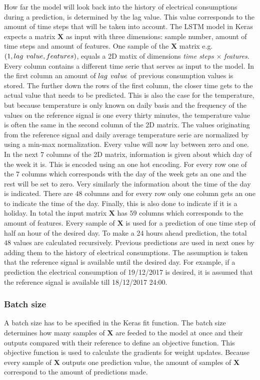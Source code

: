 How far the model will look back into the history of electrical consumptions during a prediction, is determined by the lag value. This value corresponds to the amount of time steps that will be taken into account. The LSTM model in Keras expects a matrix $ \bm{X} $ as input with three dimensions: sample number, amount of time steps and amount of features. 
One sample of the $ \bm{X} $ matrix e.g. $ (1,lag\hspace{1.5mm}value, features) $, equals a 2D matix of dimensions  \textit{time steps} $ \times $ \textit{features}. Every column contains a different time serie that serves as input to the model. In the first column an amount of $ lag\hspace{1.5mm}value $ of previous consumption values is stored. The further down the rows of the first column, the closer time gets to the actual value that needs to be predicted. This is also the case for the temperature, but because temperature is only known on daily basis and the frequency of the values on the reference signal is one every thirty minutes, the temperature value is often the same in the second column of the 2D matrix. The values originating from the reference signal and daily average temperature serie are normalized by using a min-max normalization. Every value will now lay between zero and one.\\
In the next $ 7 $ columns of the 2D matrix, information is given about which day of the week it is. This is encoded using an one hot encoding. For every row one of the $ 7 $ columns which corresponds with the day of the week gets an one and the rest will be set to zero. Very similarly the information about the time of the day is indicated. There are $ 48 $ columns and for every row only one column gets an one to indicate the time of the day. Finally, this is also done to indicate if it is a holiday. In total the input matrix $ \bm{X} $ has $ 59  $ columns which corresponds to the amount of features. Every sample of $ \bm{X} $ is used for a prediction of one time step of half an hour of the desired day. To make a 24 hours ahead prediction, the total $ 48 $ values are calculated recursively. Previous predictions are used in next ones by adding them to the history of electrical consumptions. The assumption is taken that the reference signal is available until the desired day. For example, if a prediction the electrical consumption of 19/12/2017 is desired, it is assumed that the reference signal is available till 18/12/2017 24:00.

\subsubsection{Batch size}
A batch size has to be specified in the Keras fit function. The batch size determines how many samples of $ \bm{X} $ are feeded to the model at once and their outputs compared with their reference to define an objective function. This objective function is used to calculate the gradients for weight updates. Because every sample of $ \bm{X} $ outputs one prediction value, the amount of samples of $ \bm{X} $ correspond to the amount of predictions made.\\

